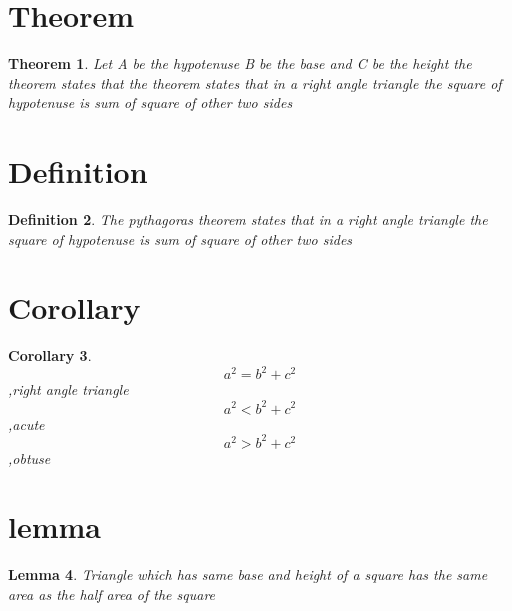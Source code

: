 \documentclass[a4paper,12pt]{article}
\newtheorem{theorem}{Theorem}[section]
\newtheorem{definition}[theorem]{Definition}
\newtheorem{corollary}[theorem]{Corollary}
\newtheorem{lemma}[theorem]{Lemma}
\begin{document}
\section{Theorem}
\begin{theorem}
Let A be the hypotenuse B be the base and C be the height the theorem states that the theorem states that in a right angle triangle the square of hypotenuse is sum of square of other two sides
\end{theorem}
\section{Definition}
\begin{definition}
The pythagoras theorem states that in a right angle triangle the square of hypotenuse is sum of square of other two sides
\end{definition}
\section{Corollary}
\begin{corollary}

\[a^2 = b^2 + c^2\] ,right angle triangle
\[a^2 < b^2 + c^2\] ,acute
\[a^2 > b^2 + c^2\] ,obtuse
\end{corollary}
\section{lemma}
\begin{lemma}
Triangle which has same base and height of a square has the same area as the half area of the square
\end{lemma}
\end{document}
